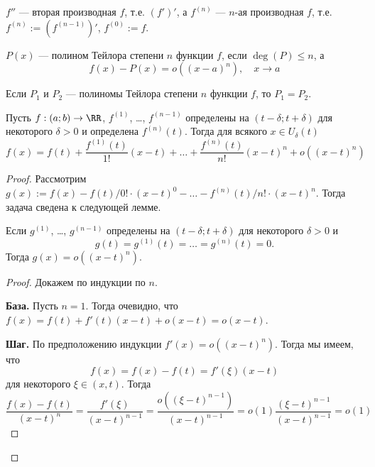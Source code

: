 \documentclass[12pt,a4paper]{article}
\begin{document}
    \begin{definition}
        $f''$ --- вторая производная $f$, т.е. $(f')'$, а $f^{(n)}$ --- $n$-ая производная $f$, т.е. $f^{(n)} := (f^{(n-1)})'$, $f^{(0)} := f$.
    \end{definition}

    \begin{definition}
        $P(x)$ --- полином Тейлора степени $n$ функции $f$, если $\deg(P) \leqslant n$, а
        \[f(x) - P(x) = o((x-a)^n),\quad x \to a\]
    \end{definition}

    \begin{theorem}
        Если $P_1$ и $P_2$ --- полиномы Тейлора степени $n$ функции $f$, то $P_1 = P_2$.
    \end{theorem}

    \begin{theorem}
        Пусть $f: (a; b) \to \RR$, $f^{(1)}$, \dots, $f^{(n-1)}$ определены на $(t-\delta; t+\delta)$ для некоторого $\delta > 0$ и определена $f^{(n)}(t)$. Тогда для всякого $x \in U_\delta(t)$
        \[f(x) = f(t) + \frac{f^{(1)}(t)}{1!}(x-t) + \dots + \frac{f^{(n)}(t)}{n!}(x-t)^n + o((x-t)^n)\]
    \end{theorem}

    \begin{proof}
        Рассмотрим $g(x) := f(x) - f(t)/0! \cdot (x-t)^0 - \dots - f^{(n)}(t)/n! \cdot (x-t)^n$. Тогда задача сведена к следующей лемме.

        \begin{thlemma}
            Если $g^{(1)}$, \dots, $g^{(n-1)}$ определены на $(t-\delta; t+\delta)$ для некоторого $\delta > 0$ и
            \[g(t) = g^{(1)}(t) = \dots = g^{(n)}(t) = 0.\]
            Тогда $g(x) = o((x-t)^n)$.
        \end{thlemma}

        \begin{proof}
            Докажем по индукции по $n$.

            \textbf{База.} Пусть $n = 1$. Тогда очевидно, что $f(x) = f(t) + f'(t)(x-t) + o(x-t) = o(x-t)$.

            \textbf{Шаг.} По предположению индукции $f'(x) = o((x-t)^n)$. Тогда мы имеем, что
            \[f(x) = f(x) - f(t) = f'(\xi) (x - t)\]
            для некоторого $\xi \in (x, t)$. Тогда
            \[\frac{f(x) - f(t)}{(x-t)^n} = \frac{f'(\xi)}{(x-t)^{n-1}} = \frac{o((\xi-t)^{n-1})}{(x-t)^{n-1}} = o(1) \frac{(\xi - t)^{n-1}}{(x-t)^{n-1}} = o(1)\]
        \end{proof}
    \end{proof}
\end{document}
